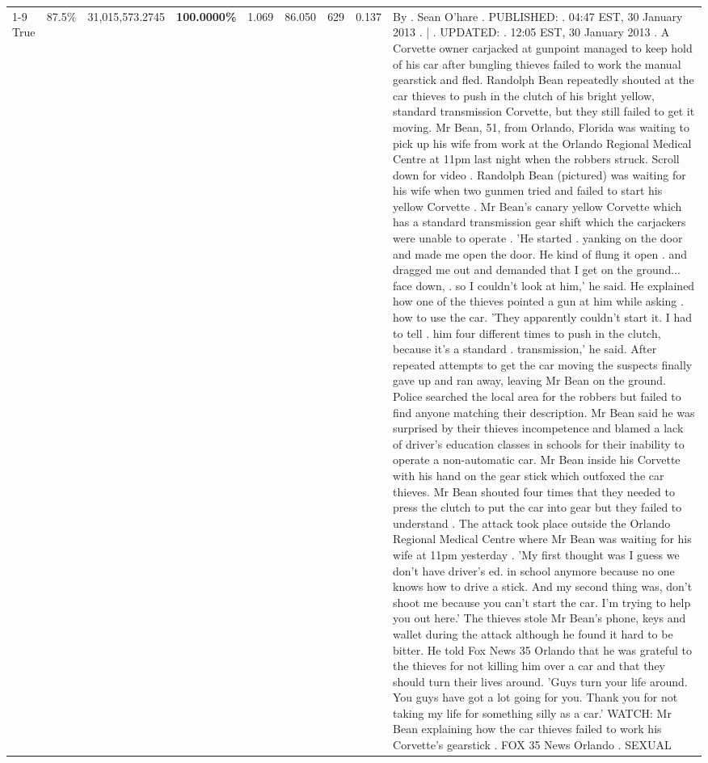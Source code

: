 \begin{table}[H]
\begin{tabular}{lllrlllll}
\cline{1-9} \cline{2-9}
True & 87.5\% & 31,015,573.2745 & \bfseries \color{red} 100.0000\% & 1.069 & 86.050 & 629 & 0.137 & By . Sean O'hare . PUBLISHED: . 04:47 EST, 30 January 2013 . | . UPDATED: . 12:05 EST, 30 January 2013 . A Corvette owner carjacked at gunpoint managed to keep hold of his car after bungling thieves failed to work the manual gearstick and fled. Randolph Bean repeatedly shouted at the car thieves to push in the clutch of his bright yellow, standard transmission Corvette, but they still failed to get it moving. Mr Bean, 51, from Orlando, Florida was waiting to pick up his wife from work at the Orlando Regional Medical Centre at 11pm last night when the robbers struck. Scroll down for video . Randolph Bean (pictured) was waiting for his wife when two gunmen tried and failed to start his yellow Corvette . Mr Bean's canary yellow Corvette which has a standard transmission gear shift which the carjackers were unable to operate . 'He started . yanking on the door and made me open the door. He kind of flung it open . and dragged me out and demanded that I get on the ground... face down, . so I couldn't look at him,' he said. He explained how one of the thieves pointed a gun at him while asking . how to use the car. 'They apparently couldn't start it. I had to tell . him four different times to push in the clutch, because it's a standard . transmission,' he said. After repeated attempts to get the car moving the suspects finally gave up and ran away, leaving Mr Bean on the ground. Police searched the local area for the robbers but failed to find anyone matching their description. Mr Bean said he was surprised by their thieves incompetence and blamed a lack of driver's education classes in schools for their inability to operate a non-automatic car. Mr Bean inside his Corvette with his hand on the gear stick which outfoxed the car thieves. Mr Bean shouted four times that they needed to press the clutch to put the car into gear but they failed to understand . The attack took place outside the Orlando Regional Medical Centre where Mr Bean was waiting for his wife at 11pm yesterday . 'My first thought was I guess we don't have driver's ed. in school anymore because no one knows how to drive a stick. And my second thing was, don't shoot me because you can't start the car. I'm trying to help you out here.' The thieves stole Mr Bean's phone, keys and wallet during the attack although he found it hard to be bitter. He told Fox News 35 Orlando that he was grateful to the thieves for not killing him over a car and that they should turn their lives around. 'Guys turn your life around. You guys have got a lot going for you. Thank you for not taking my life for something silly as a car.' WATCH: Mr Bean explaining how the car thieves failed to work his Corvette's gearstick . FOX 35 News Orlando . SEXUAL \\

\end{tabular}
\end{table}
